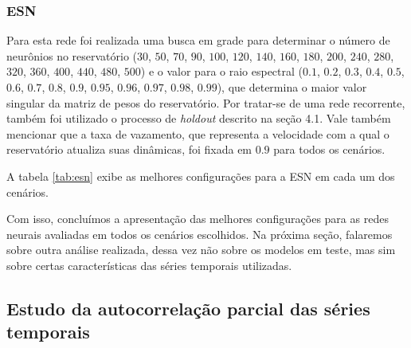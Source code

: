 \documentclass[a4paper, 12pt]{article}
\begin{document}
\subsubsection{ESN}

Para esta rede foi realizada uma busca em grade para determinar o número de neurônios no reservatório ($30$, $50$, $70$, $90$, $100$, $120$, $140$, $160$, $180$, $200$, $240$, $280$, $320$, $360$, $400$, $440$, $480$, $500$) e o valor para o raio espectral ($0.1$, $0.2$, $0.3$, $0.4$, $0.5$, $0.6$, $0.7$, $0.8$, $0.9$, $0.95$, $0.96$, $0.97$, $0.98$, $0.99$), que determina o maior valor singular da matriz de pesos do reservatório. Por tratar-se de uma rede recorrente, também foi utilizado o processo de \textit{holdout} descrito na seção 4.1. Vale também mencionar que a taxa de vazamento, que representa a velocidade com a qual o reservatório atualiza suas dinâmicas, foi fixada em $0.9$ para todos os cenários.

A tabela \ref{tab:esn} exibe as melhores configurações para a ESN em cada um dos cenários.
\begin{table}[H]
\begin{center}
\caption{Melhores parâmetros para a rede ESN nos cenários em análise}
\label{tab:esn}
\end{center}
\end{table}

Com isso, concluímos a apresentação das melhores configurações para as redes neurais avaliadas em todos os cenários escolhidos. Na próxima seção, falaremos sobre outra análise realizada, dessa vez não sobre os modelos em teste, mas sim sobre certas características das séries temporais utilizadas. 

\subsection{Estudo da autocorrelação parcial das séries temporais}
\end{document}
